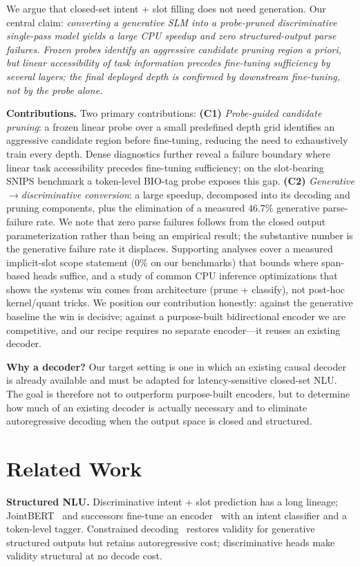 \documentclass{article}
\begin{document}
We argue that closed-set intent + slot filling does not need generation. Our
central claim: \emph{converting a generative SLM into a probe-pruned
discriminative single-pass model yields a large CPU speedup and zero
structured-output parse failures. Frozen probes identify an aggressive
candidate pruning region a priori, but linear accessibility of task
information precedes fine-tuning sufficiency by several layers; the final
deployed depth is confirmed by downstream fine-tuning, not by the probe
alone.}

\textbf{Contributions.} Two primary contributions:
\textbf{(C1)} \emph{Probe-guided candidate pruning}: a frozen linear probe
over a small predefined depth grid identifies an aggressive candidate region
before fine-tuning, reducing the need to exhaustively train every depth.
Dense diagnostics further reveal a failure boundary where linear task
accessibility precedes fine-tuning sufficiency; on the slot-bearing SNIPS
benchmark a token-level BIO-tag probe exposes this gap.
\textbf{(C2)} \emph{Generative$\rightarrow$discriminative conversion}: a large
speedup, decomposed into its decoding and pruning components, plus the
elimination of a measured 46.7\% generative parse-failure rate. We note that
zero parse failures follows from the closed output parameterization rather than
being an empirical result; the substantive number is the generative failure rate
it displaces. Supporting analyses cover a measured implicit-slot scope
statement (0\% on our benchmarks) that bounds where span-based heads suffice,
and a study of common CPU inference optimizations that shows the systems win
comes from architecture (prune + classify), not post-hoc kernel/quant tricks.
We position our contribution honestly: against the generative baseline the win
is decisive; against a purpose-built bidirectional encoder we are competitive,
and our recipe requires no separate encoder---it reuses an existing decoder.

\textbf{Why a decoder?} Our target setting is one in which an existing causal
decoder is already available and must be adapted for latency-sensitive
closed-set NLU. The goal is therefore not to outperform purpose-built
encoders, but to determine how much of an existing decoder is actually
necessary and to eliminate autoregressive decoding when the output space is
closed and structured.
\section{Related Work}\label{sec:related}
\textbf{Structured NLU.} Discriminative intent + slot prediction has a long
lineage; JointBERT~\citep{chen2019bert} and successors fine-tune an
encoder~\citep{devlin2019bert,vaswani2017attention} with an intent classifier
and a token-level tagger. Constrained decoding~\citep{willard2023guidance}
restores validity for generative structured outputs but retains autoregressive
cost; discriminative heads make validity structural at no decode cost.
\end{document}
